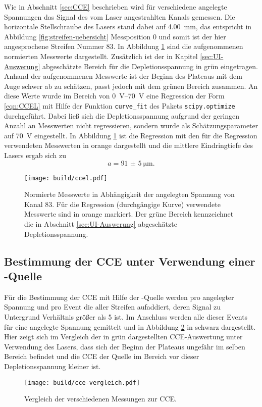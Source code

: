 Wie in Abschnitt \ref{sec:CCE} beschrieben wird für verschiedene angelegte Spannungen
das Signal des vom Laser angestrahlten Kanals gemessen.
Die horizontale Stellschraube des Lasers stand dabei auf \SI{4.00}{\milli\meter},
das entspricht in Abbildung \ref{fig:streifen-uebersicht} Messposition \num{0}
und somit ist der hier angesprochene Streifen Nummer \num{83}.
In Abbildung \ref{fig:ccel} sind die aufgenommenen normierten Messwerte dargestellt.
Zusätzlich ist der in Kapitel \ref{sec:UI-Auswerung} abgeschätzte Bereich für die
Depletionsspannung in grün eingetragen.
Anhand der aufgenommenen Messwerte ist der Beginn des Plateaus mit dem Auge schwer
ab zu schätzen, passt jedoch mit dem grünen Bereich zusammen.
An diese Werte wurde im Bereich von \SIrange{0}{70}{\volt} eine Regression
der Form \eqref{eqn:CCEL} mit Hilfe der Funktion \texttt{curve\_fit} des Pakets
\texttt{scipy.optimize} durchgeführt.
Dabei ließ sich die Depletionsspannung aufgrund der geringen Anzahl an Messwerten
nicht regressieren, sondern wurde als Schätzungsparameter auf \SI{70}{\volt}
eingestellt.
In Abbildung \ref{fig:ccel} ist die Regression mit den für die Regression verwendeten
Messwerten in orange dargestellt und die mittlere Eindringtiefe des Lasers
ergab sich zu
\begin{equation*}
  a = \SI{91(5)}{\micro\meter}.
\end{equation*}
\begin{figure}
  \centering
  \texttt{[image: build/ccel.pdf]}  %
  \caption{Normierte Messwerte in Abhängigkeit der angelegten Spannung von Kanal
  83. Für die Regression (durchgängige Kurve) verwendete Messwerte sind in orange markiert.
  Der grüne Bereich kennzeichnet die in Abschnitt \ref{sec:UI-Auswerung} abgeschätzte
  Depletionsspannung.}
  \label{fig:ccel}
\end{figure}

\FloatBarrier
\subsection{Bestimmung der CCE unter Verwendung einer \texorpdfstring{}{Sr}-Quelle}
\label{sec:CCEQ-Auswertung}

Für die Bestimmung der CCE mit Hilfe der -Quelle werden pro angelegter
Spannung und pro Event die \si{\adc} aller Streifen aufaddiert, deren
Signal zu Untergrund Verhältnis größer als \num{5} ist.
Im Anschluss werden alle dieser Events für eine angelegte Spannung gemittelt und
in Abbildung \ref{fig:cce-vergleich} in schwarz dargestellt.
Hier zeigt sich im Vergleich der in grün dargestellten CCE-Auswertung unter
Verwendung des Lasers, dass sich der Beginn der Plateaus ungefähr im selben Bereich
befindet und die CCE der Quelle im Bereich vor dieser Depletionsspannung kleiner
ist.
\begin{figure}
  \centering
  \texttt{[image: build/cce-vergleich.pdf]}  %
  \caption{Vergleich der verschiedenen Messungen zur CCE.}
  \label{fig:cce-vergleich}
\end{figure}

